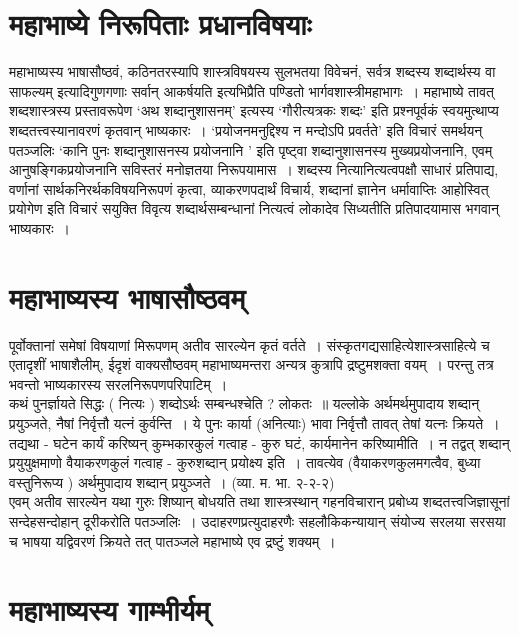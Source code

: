 {\section*{महाभाष्ये निरूपिताः प्रधानविषयाः}

महाभाष्यस्य भाषासौष्ठवं, कठिनतरस्यापि शास्त्रविषयस्य सुलभतया विवेचनं, सर्वत्र शब्दस्य शब्दार्थस्य वा साफल्यम् इत्यादिगुणगणाः सर्वान् आकर्षयति इत्यभिप्रैति पण्डितो भार्गवशास्त्रीमहाभागः~। महाभाष्ये तावत् शब्दशास्त्रस्य प्रस्तावरूपेण ‘अथ शब्दानुशासनम्’ इत्यस्य ‘गौरीत्यत्रकः शब्दः’ इति प्रश्नपूर्वकं स्वयमुत्थाप्य शब्दतत्त्वस्यानावरणं कृतवान् भाष्यकारः~। ‘प्रयोजनमनुद्दिश्य न मन्दोऽपि प्रवर्तते’ इति विचारं समर्थयन् पतञ्जलिः ‘कानि पुनः शब्दानुशासनस्य प्रयोजनानि ’ इति पृष्ट्वा शब्दानुशासनस्य मुख्यप्रयोजनानि, एवम् आनुषङ्गिकप्रयोजनानि सविस्तरं मनोज्ञतया निरूपयामास~। शब्दस्य नित्यानित्यत्वपक्षौ साधारं प्रतिपाद्य, वर्णानां सार्थकनिरर्थकविषयनिरूपणं कृत्वा, व्याकरणपदार्थं विचार्य, शब्दानां ज्ञानेन धर्मावाप्तिः आहोस्वित् प्रयोगेण इति विचारं सयुक्ति विवृत्य शब्दार्थसम्बन्धानां नित्यत्वं लोकादेव सिध्यतीति प्रतिपादयामास भगवान् भाष्यकारः~। 
~\\[-0.75cm]
\section*{महाभाष्यस्य भाषासौष्ठवम्}

पूर्वोक्तानां समेषां विषयाणां मिरूपणम् अतीव सारल्येन कृतं वर्तते~। संस्कृतगद्यसाहित्ये\break शास्त्रसाहित्ये च एतादृशीं भाषाशैलीम्, ईदृशं वाक्यसौष्ठवम् महाभाष्यमन्तरा अन्यत्र कुत्रापि द्रष्टुमशक्ता वयम्~। परन्तु तत्र भवन्तो भाष्यकारस्य सरलनिरूपणपरिपाटिम्~।
~\\[0.1cm]
कथं पुनर्ज्ञायते सिद्धः ( नित्यः ) शब्दोऽर्थः सम्बन्धश्चेति ? लोकतः~॥ यल्लोके अर्थमर्थमुपादाय शब्दान् प्रयुञ्जते, नैषां निर्वृत्तौ यत्नं कुर्वन्ति~। ये पुनः कार्या (अनित्याः) भावा निर्वृत्तौ तावत् तेषां यत्नः क्रियते~। तद्यथा - घटेन कार्यं करिष्यन् कुम्भकारकुलं गत्वाह - कुरु घटं, कार्यमानेन करिष्यामीति~। न तद्वत् शब्दान् प्रयुयुक्षमाणो वैयाकरणकुलं गत्वाह - कुरु\break शब्दान् प्रयोक्ष्य इति~। तावत्येव (वैयाकरणकुलमगत्वैव, बुध्या वस्तुनिरूप्य ) अर्थमुपादाय शब्दान् प्रयुञ्जते~। (व्या. म. भा. २-२-२)
~\\[0.1cm]
एवम् अतीव सारल्येन यथा गुरुः शिष्यान् बोधयति तथा शास्त्रस्थान् गहनविचारान् प्रबोध्य शब्दतत्त्वजिज्ञासूनां सन्देहसन्दोहान् दूरीकरोति पतञ्जलिः~। उदाहरणप्रत्युदाहरणैः सह\break लौकिकन्यायान् संयोज्य सरलया सरसया च भाषया यद्विवरणं क्रियते तत् पातञ्जले महाभाष्ये एव द्रष्टुं शक्यम्~। 
~\\[-0.75cm]
\section*{महाभाष्यस्य गाम्भीर्यम्}

}
